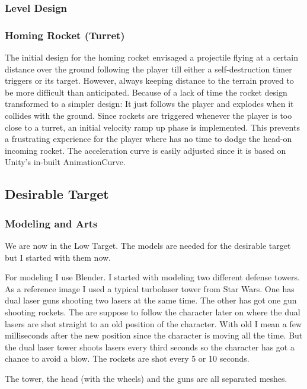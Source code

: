 \documentclass[12pt, letterpaper]{scrartcl}
\begin{document}
	\subsubsection{Level Design}
	
	\subsubsection{Homing Rocket (Turret)}
	The initial design for the homing rocket envisaged a projectile flying at a certain distance over the ground following the player till either a self-destruction timer triggers or its target. However, always keeping distance to the terrain proved to be more difficult than anticipated. Because of a lack of time the rocket design transformed to a simpler design: It just follows the player and explodes when it collides with the ground.
	Since rockets are triggered whenever the player is too close to a turret, an initial velocity ramp up phase is implemented. This prevents a frustrating experience for the player where has no time to dodge the head-on incoming rocket. The acceleration curve is easily adjusted since it is based on Unity's in-built AnimationCurve.
	
	\subsection{Desirable Target}
	
	\subsubsection{Modeling and Arts}
	We are now in the Low Target. The models are needed for the desirable target but I started with them now. 
	
	For modeling I use Blender. I started with modeling two different defense towers. As a reference image I used a typical turbolaser tower from Star Wars.
	One has dual laser guns shooting two lasers at the same time. The other has got one gun shooting rockets. The are suppose to follow the character later on where the dual lasers are shot straight to an old position of the character. With old I mean a few milliseconds after the new position since the character is moving all the time. But the dual laser tower shoots lasers every third seconds so the character has got a chance to avoid a blow. The rockets are shot every 5 or 10 seconds.
	
	The tower, the head (with the wheels) and the guns are all separated meshes.
	
\end{document}
